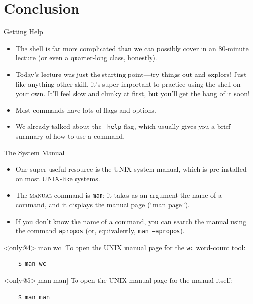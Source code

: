 \section{Conclusion}
\begin{frame}{Getting Help}
  \begin{itemize}
    \item
      The shell is far more complicated than we can possibly cover in an
      80-minute lecture (or even a quarter-long class, honestly).
      \pause
    \item
      Today's lecture was just the starting point---try things out and explore!
      Just like anything other skill, it's super important to practice using
      the shell on your own.  It'll feel slow and clunky at first, but you'll
      get the hang of it soon!
      \pause
    \item
      Most commands have lots of flags and options.
      \pause
    \item
      We already talked about the \texttt{--help} flag, which usually gives you
      a brief summary of how to use a command.
  \end{itemize}
\end{frame}

\begin{frame}[fragile]{The System Manual}
  \begin{itemize}
    \item
      One super-useful resource is the UNIX system manual, which is
      pre-installed on most UNIX-like systems.
      \pause
    \item
      \alert<2>{The \textsc{manual} command is \texttt{man}}; it takes as an
      argument the name of a command, and it displays the manual page
      (\enquote{man page}).
      \pause
    \item
      If you don't know the name of a command, you can search the manual using
      the command \texttt{apropos} (or, equivalently, \texttt{man --apropos}).
  \end{itemize}
  \pause
  \begin{example}<only@4>[man wc]
    To open the UNIX manual page for the \texttt{wc} word-count tool:
    \begin{verbatim}
    $ man wc
    \end{verbatim}
  \end{example}
  \pause
  \begin{example}<only@5>[man man]
    To open the UNIX manual page for the manual itself:
    \begin{verbatim}
    $ man man
    \end{verbatim}
  \end{example}
\end{frame}

